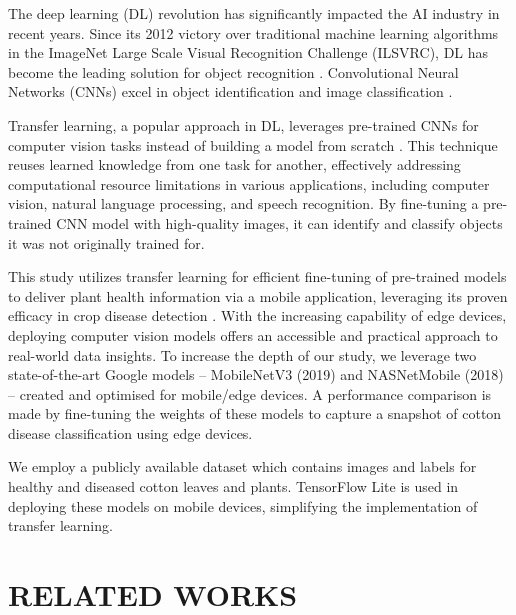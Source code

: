 \documentclass[conference]{IEEEtran}
\begin{document}
The deep learning (DL) revolution has significantly impacted the AI industry in recent years. Since its 2012 victory over traditional machine learning algorithms in the ImageNet Large Scale Visual Recognition Challenge (ILSVRC), DL has become the leading solution for object recognition \cite{Ashqar-Naser}\cite{Gehlot-Saini}. Convolutional Neural Networks (CNNs) excel in object identification and image classification \cite{Sarangdhar-Pawar}.

Transfer learning, a popular approach in DL, leverages pre-trained CNNs for computer vision tasks instead of building a model from scratch \cite{Brownlee}. This technique reuses learned knowledge from one task for another, effectively addressing computational resource limitations in various applications, including computer vision, natural language processing, and speech recognition. By fine-tuning a pre-trained CNN model with high-quality images, it can identify and classify objects it was not originally trained for.

This study utilizes transfer learning for efficient fine-tuning of pre-trained models to deliver plant health information via a mobile application, leveraging its proven efficacy in crop disease detection \cite{Disease Detection} \cite{Disease Diagnosing}. With the increasing capability of edge devices, deploying computer vision models offers an accessible and practical approach to real-world data insights. To increase the depth of our study, we leverage two state-of-the-art Google models -- MobileNetV3 (2019) and NASNetMobile (2018) \cite{WandB} -- created and optimised for mobile/edge devices.  A performance comparison is made by fine-tuning the weights of these models to capture a snapshot of cotton disease classification using edge devices. 

We employ a publicly available dataset \cite{Kaggle} which contains images and labels for healthy and diseased cotton leaves and plants. TensorFlow Lite is used in deploying these models on mobile devices, simplifying the implementation of transfer learning.


\section{RELATED WORKS}
\end{document}
